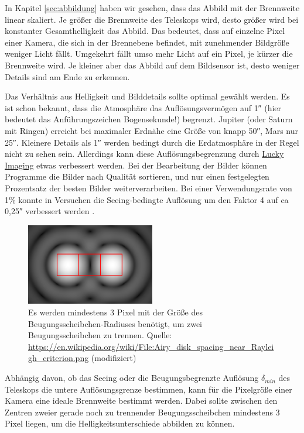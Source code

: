 \documentclass[10pt,a4paper,titlepage]{article}
\begin{document}
In Kapitel \ref{sec:abbildung} haben wir gesehen, dass das Abbild mit der Brennweite linear skaliert. Je größer die Brennweite des Teleskops wird, desto größer wird bei konstanter Gesamthelligkeit das Abbild. Das bedeutet, dass auf einzelne Pixel einer Kamera, die sich in der Brennebene befindet, mit zunehmender Bildgröße weniger Licht fällt. Umgekehrt fällt umso mehr Licht auf ein Pixel, je kürzer die Brennweite wird. Je kleiner aber das Abbild auf dem Bildsensor ist, desto weniger Details sind am Ende zu erkennen.

Das Verhältnis aus Helligkeit und Bilddetails sollte optimal gewählt werden. Es ist schon bekannt, dass die Atmosphäre das Auflösungsvermögen auf \ang{;;1} (hier bedeutet das Anführungszeichen Bogensekunde!) begrenzt. Jupiter (oder Saturn mit Ringen) erreicht bei maximaler Erdnähe eine Größe von knapp \ang{;;50}, Mars nur \ang{;;25}. Kleinere Details als \ang{;;1} werden bedingt durch die Erdatmosphäre in der Regel nicht zu sehen sein. Allerdings kann diese Auflösungsbegrenzung durch \href{https://de.wikipedia.org/wiki/Lucky_Imaging}{Lucky Imaging} etwas verbessert werden. Bei der Bearbeitung der Bilder können Programme die Bilder nach Qualität sortieren, und nur einen festgelegten Prozentsatz der besten Bilder weiterverarbeiten. Bei einer Verwendungsrate von 1\% konnte in Versuchen die Seeing-bedingte Auflösung um den Faktor 4 auf ca \ang{;;0,25} verbessert werden \cite{law2006lucky}.

\begin{figure}[h!]
  \centering
    \includegraphics[width=0.5\textwidth]{Pixel_Aufloesung}
  \caption{Es werden mindestens 3 Pixel mit der Größe des Beugungsscheibchen-Radiuses benötigt, um zwei Beugungsscheibchen zu trennen. Quelle: \url{https://en.wikipedia.org/wiki/File:Airy_disk_spacing_near_Rayleigh_criterion.png} (modifiziert)}
  \label{fig:pixel-aufloesung}
\end{figure}

Abhängig davon, ob das Seeing oder die Beugungsbegrenzte Auflösung $\delta_{min}$ des Teleskops die untere Auflösungsgrenze bestimmen, kann für die Pixelgröße einer Kamera eine ideale Brennweite bestimmt werden. Dabei sollte zwischen den Zentren zweier gerade noch zu trennender Beugungsscheibchen mindestens 3 Pixel liegen, um die Helligkeitsunterschiede abbilden zu können.
\end{document}
